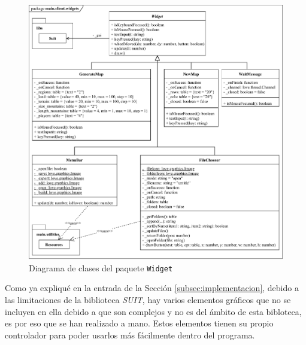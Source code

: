\begin{figure}[!h]
	\centering
	\includegraphics[width=\textwidth]{images/clases-widgets.pdf}
	\caption{Diagrama de clases del paquete \texttt{Widget}}
	\label{fig:widgetclasses}
\end{figure}

Como ya expliqué en la entrada de la Sección \ref{subsec:implementacion}, debido a las limitaciones de la biblioteca \textit{SUIT}, hay varios elementos gráficos que no se incluyen en ella debido a que son complejos y no es del ámbito de esta bibloteca, es por eso que se han realizado a mano. Estos elementos tienen su propio controlador para poder usarlos más fácilmente dentro del programa.

